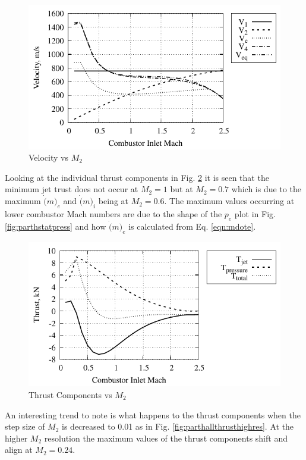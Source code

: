 \documentclass[conf]{new-aiaa} %
\begin{document}
\begin{figure}[H] %
    \centering
    \includegraphics[]{media/performance_parameter_files/part_h_velocity.pdf}
    \caption{\label{fig:parthvelocity}Velocity vs \texorpdfstring{\textit{$M_2$}}{M2}}
\end{figure}
Looking at the individual thrust components in Fig. \ref{fig:parthallthrust} it is seen that the minimum jet trust does not occur at $M_2=1$ but at $M_2=0.7$ which is due to the maximum $\dot(m)_e$ and $\dot(m)_i$ being at $M_2=0.6$. The maximum values occurring at lower combustor Mach numbers are due to the shape of the $p_e$ plot in Fig. \ref{fig:parthstatpress} and how $\dot(m)_e$ is calculated from Eq. \ref{eqn:mdote}.

\begin{figure}[H] %
    \centering
    \includegraphics[]{media/performance_parameter_files/part_h_all_thrust.pdf}
    \caption{\label{fig:parthallthrust}Thrust Components vs \texorpdfstring{\textit{$M_2$}}{M2}}
\end{figure}
An interesting trend to note is what happens to the thrust components when the step size of $M_2$ is decreased to 0.01 as in Fig. \ref{fig:parthallthrusthighres}. At the higher $M_2$ resolution the maximum values of the thrust components shift and align at $M_2=0.24$.
\end{document}
